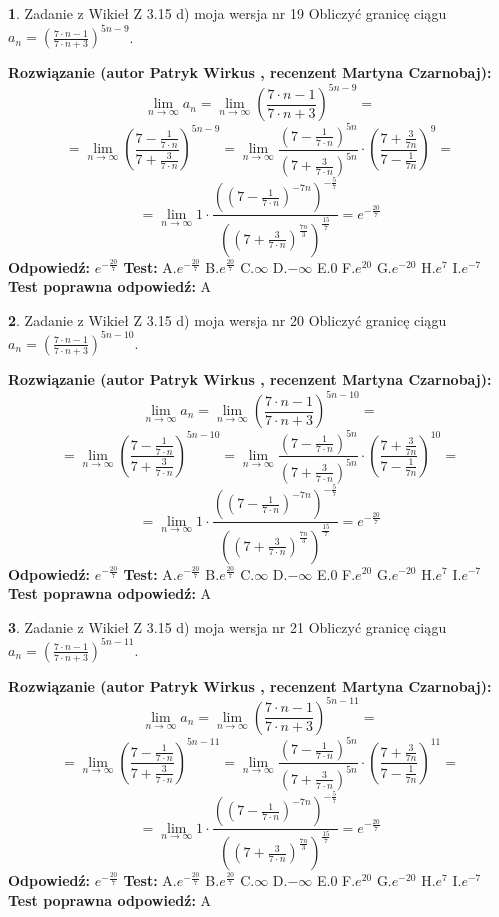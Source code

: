 \documentclass[12pt, a4paper]{article}
\theoremstyle{definition} %
\newtheorem{zad}{}
\newcommand{\zadStart}[1]{\begin{zad}#1\newline}
\newcommand{\zadStop}{\end{zad}}
\newcommand{\rozwStart}[2]{\noindent \textbf{Rozwiązanie (autor #1 , recenzent #2): }\newline}
\newcommand{\rozwStop}{\newline}
\newcommand{\odpStart}{\noindent \textbf{Odpowiedź:}\newline}
\newcommand{\odpStop}{\newline}
\newcommand{\testStart}{\noindent \textbf{Test:}\newline}
\newcommand{\testStop}{\newline}
\newcommand{\kluczStart}{\noindent \textbf{Test poprawna odpowiedź:}\newline}
\newcommand{\kluczStop}{\newline}
\begin{document}
\zadStart{Zadanie z Wikieł Z 3.15 d) moja wersja nr 19}
Obliczyć granicę ciągu $a_{n}=(\frac{7\cdot n - 1}{7 \cdot n + 3})^{5n-9}$.
\zadStop
\rozwStart{Patryk Wirkus}{Martyna Czarnobaj}
$$\lim\limits_{n\to\infty} a_{n} = \lim\limits_{n\to\infty}(\frac{7\cdot n - 1}{7 \cdot n + 3})^{5n-9}=$$
$$=\lim\limits_{n\to\infty}(\frac{7 - \frac{1}{7\cdot n}}{7 + \frac{3}{7 \cdot n}})^{5n-9}=\lim\limits_{n\to\infty}\frac{(7 - \frac{1}{7\cdot n})^{5n}}{(7 + \frac{3}{7\cdot n})^{5n}} \cdot (\frac{7+\frac{3}{7n}}{7-\frac{1}{7n}})^{9}=$$
$$=\lim\limits_{n\to\infty} 1 \cdot \frac{((7-\frac{1}{7 \cdot n})^{-7n})^{-\frac{5}{7}}}{((7+\frac{3}{7 \cdot n})^{\frac{7n}{3}})^{\frac{15}{7}}} =e^{-\frac{20}{7}}$$
\rozwStop
\odpStart
$e^{-\frac{20}{7}}$
\odpStop
\testStart
A.$ e^{-\frac{20}{7}}$
B.$ e^{\frac{20}{7}}$
C.$\infty$
D.$-\infty$
E.$0$
F.$e^{20}$
G.$e^{-20}$
H.$e^{7}$
I.$e^{-7}$
\testStop
\kluczStart
A
\kluczStop



\zadStart{Zadanie z Wikieł Z 3.15 d) moja wersja nr 20}
Obliczyć granicę ciągu $a_{n}=(\frac{7\cdot n - 1}{7 \cdot n + 3})^{5n-10}$.
\zadStop
\rozwStart{Patryk Wirkus}{Martyna Czarnobaj}
$$\lim\limits_{n\to\infty} a_{n} = \lim\limits_{n\to\infty}(\frac{7\cdot n - 1}{7 \cdot n + 3})^{5n-10}=$$
$$=\lim\limits_{n\to\infty}(\frac{7 - \frac{1}{7\cdot n}}{7 + \frac{3}{7 \cdot n}})^{5n-10}=\lim\limits_{n\to\infty}\frac{(7 - \frac{1}{7\cdot n})^{5n}}{(7 + \frac{3}{7\cdot n})^{5n}} \cdot (\frac{7+\frac{3}{7n}}{7-\frac{1}{7n}})^{10}=$$
$$=\lim\limits_{n\to\infty} 1 \cdot \frac{((7-\frac{1}{7 \cdot n})^{-7n})^{-\frac{5}{7}}}{((7+\frac{3}{7 \cdot n})^{\frac{7n}{3}})^{\frac{15}{7}}} =e^{-\frac{20}{7}}$$
\rozwStop
\odpStart
$e^{-\frac{20}{7}}$
\odpStop
\testStart
A.$ e^{-\frac{20}{7}}$
B.$ e^{\frac{20}{7}}$
C.$\infty$
D.$-\infty$
E.$0$
F.$e^{20}$
G.$e^{-20}$
H.$e^{7}$
I.$e^{-7}$
\testStop
\kluczStart
A
\kluczStop



\zadStart{Zadanie z Wikieł Z 3.15 d) moja wersja nr 21}
Obliczyć granicę ciągu $a_{n}=(\frac{7\cdot n - 1}{7 \cdot n + 3})^{5n-11}$.
\zadStop
\rozwStart{Patryk Wirkus}{Martyna Czarnobaj}
$$\lim\limits_{n\to\infty} a_{n} = \lim\limits_{n\to\infty}(\frac{7\cdot n - 1}{7 \cdot n + 3})^{5n-11}=$$
$$=\lim\limits_{n\to\infty}(\frac{7 - \frac{1}{7\cdot n}}{7 + \frac{3}{7 \cdot n}})^{5n-11}=\lim\limits_{n\to\infty}\frac{(7 - \frac{1}{7\cdot n})^{5n}}{(7 + \frac{3}{7\cdot n})^{5n}} \cdot (\frac{7+\frac{3}{7n}}{7-\frac{1}{7n}})^{11}=$$
$$=\lim\limits_{n\to\infty} 1 \cdot \frac{((7-\frac{1}{7 \cdot n})^{-7n})^{-\frac{5}{7}}}{((7+\frac{3}{7 \cdot n})^{\frac{7n}{3}})^{\frac{15}{7}}} =e^{-\frac{20}{7}}$$
\rozwStop
\odpStart
$e^{-\frac{20}{7}}$
\odpStop
\testStart
A.$ e^{-\frac{20}{7}}$
B.$ e^{\frac{20}{7}}$
C.$\infty$
D.$-\infty$
E.$0$
F.$e^{20}$
G.$e^{-20}$
H.$e^{7}$
I.$e^{-7}$
\testStop
\kluczStart
A
\kluczStop
\end{document}
